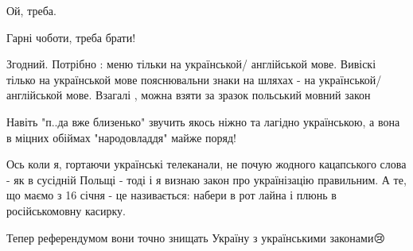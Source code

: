 \begin{itemize}
Ой, треба.

 
Гарні чоботи, треба брати!

 

Згодний. Потрібно : меню тільки на українськой/ англійськой мове. Вивіскі
тілько на українськой мове пояснювальни знаки на шляхах - на українськой/
англійськой мове. Взагалі , можна взяти за зразок польський мовний закон


 

Навіть "п..да вже близенько" звучить якось ніжно та лагідно українською, а вона в міцних обіймах "народовладдя" майже поряд!


 

Ось коли я, гортаючи українські телеканали, не почую жодного кацапського слова
- як в сусідній Польщі - тоді і я визнаю закон про українізацію правильним. А
те, що маємо з 16 січня - це називається: набери в рот лайна і плюнь в
російськомовну касирку.


 
Тепер референдумом вони точно знищать Україну з українськими законами😢

 

\end{itemize}
